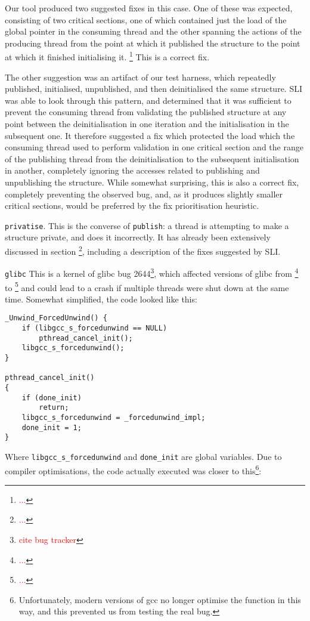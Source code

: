 \documentclass[10pt,twocolumn,preprint,natbib,authoryear]{sigplanconf}
\newcommand{\editorial}[1]{\textcolor{red}{\footnote{\textcolor{red}{#1}}}}
\begin{document}
Our tool produced two suggested fixes in this case.  One of these was
expected, consisting of two critical sections, one of which contained
just the load of the global pointer in the consuming thread and the
other spanning the actions of the producing thread from the point at
which it published the structure to the point at which it finished
initialising it. \editorial{...}  This is a correct fix.

The other suggestion was an artifact of our test harness, which
repeatedly published, initialised, unpublished, and then deinitialised
the same structure.  SLI was able to look through this pattern, and
determined that it was sufficient to prevent the consuming thread from
validating the published structure at any point between the
deinitialisation in one iteration and the initialisation in the
subsequent one.  It therefore suggested a fix which protected the load
which the consuming thread used to perform validation in one critical
section and the range of the publishing thread from the
deinitialisation to the subsequent initialisation in another,
completely ignoring the accesses related to publishing and
unpublishing the structure.  While somewhat surprising, this is also a
correct fix, completely preventing the observed bug, and, as it
produces slightly smaller critical sections, would be preferred by the
fix prioritisation heuristic.

\verb|privatise|.  This is the converse of \verb|publish|: a thread is
attempting to make a structure private, and does it incorrectly.  It
has already been extensively discussed in section \editorial{...},
including a description of the fixes suggested by SLI.

\verb|glibc| This is a kernel of glibc bug 2644\editorial{cite bug
  tracker}, which affected versions of glibc from \editorial{...}  to
\editorial{...} and could lead to a crash if multiple threads were
shut down at the same time.  Somewhat simplified, the code looked like
this:

\begin{verbatim}
_Unwind_ForcedUnwind() {
    if (libgcc_s_forcedunwind == NULL)
        pthread_cancel_init();
    libgcc_s_forcedunwind();
}

pthread_cancel_init()
{
    if (done_init)
        return;
    libgcc_s_forcedunwind = _forcedunwind_impl;
    done_init = 1;
}
\end{verbatim}

Where \verb|libgcc_s_forcedunwind| and \verb|done_init| are global
variables.  Due to compiler optimisations, the code actually executed
was closer to this\footnote{Unfortunately, modern versions of gcc no
  longer optimise the function in this way, and this prevented us from
  testing the real bug.}:
\end{document}
